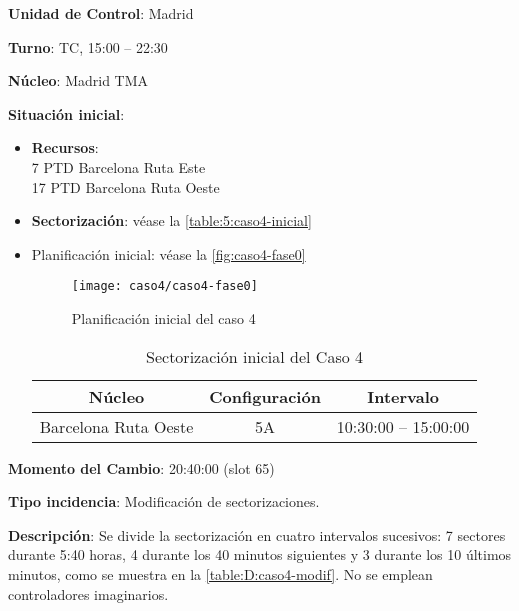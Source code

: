 \textbf{Unidad de Control}: Madrid

\textbf{Turno}: TC, 15:00 -- 22:30

\textbf{Núcleo}: Madrid TMA

\textbf{Situación inicial}:
\begin{itemize}[label={}]
	
	\item \textbf{Recursos}: \\
	7 PTD Barcelona Ruta Este \\
	17 PTD Barcelona Ruta Oeste
	
	
	\item \textbf{Sectorización}: véase la \autoref{table:5:caso4-inicial}
	
	\item Planificación inicial: véase la \autoref{fig:caso4-fase0}
	
	\begin{figure}[!h]
		\centering
		\texttt{[image: caso4/caso4-fase0]}
		\caption{Planificación inicial del caso 4}
		\label{fig:caso4-fase0}
	\end{figure}

	\begin{table}[h]
		\centering
		\caption{Sectorización inicial del Caso 4}
		\label{table:5:caso4-inicial}
		\begin{tabular}{ccc}
			\hline
			\textbf{Núcleo} & \textbf{Configuración} & \textbf{Intervalo} \\ \hline
			Barcelona Ruta Oeste             & 5A                                      & 10:30:00 -- 15:00:00                \\ \hline
		\end{tabular}
	\end{table}
\end{itemize}

\textbf{Momento del Cambio}: 20:40:00  (slot 65)

\textbf{Tipo incidencia}: Modificación de sectorizaciones.

\textbf{Descripción}: Se divide la sectorización en cuatro intervalos sucesivos: 7 sectores durante 5:40 horas, 4 durante los 40 minutos siguientes y 3 durante los 10 últimos minutos, como se muestra en la \autoref{table:D:caso4-modif}. No se emplean controladores imaginarios.

